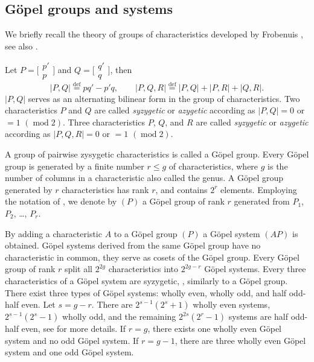 \documentclass[twoside]{amsart}
\DeclareMathOperator{\modR}{mod}
\theoremstyle{definition}
\theoremstyle{plain}
\begin{document}
\subsection{G\"{o}pel groups and systems}
We briefly recall the theory of groups of characteristics developed by Frobenuis \cite{Frob1,Frob2},
see also \cite[Ch.\,XVII]{bak897}. 

Let $P=\big[\begin{smallmatrix} p' \\ p \end{smallmatrix} \big]$ and 
$Q=\big[\begin{smallmatrix} q' \\ q \end{smallmatrix} \big]$, then
$$ |P,Q| \overset{\text{def}}{=} pq'-p'q,\qquad  
|P,Q,R| \overset{\text{def}}{=} |P,Q| + |P,R| + |Q,R|. $$
$|P,Q|$ serves as an alternating bilinear form in the group of characteristics.
Two characteristics $P$ and $Q$ are called \emph{syzygetic} or 
\emph{azygetic} according as $|P,Q| = 0$ or $=1$ $(\modR 2)$.
Three characteristics $P$, $Q$, and $R$ are called \emph{syzygetic} or 
\emph{azygetic} according as $|P,Q,R| = 0$ or $=1$ $(\modR 2)$.

A group of pairwise zysygetic characteristics  is called a G\"{o}pel group.
Every G\"{o}pel group is generated by a finite number $r\leqslant g$ of characteristics, 
where $g$ is the number of columns in a 
characteristic also called the genus. 
A G\"{o}pel group generated by $r$ characteristics has rank $r$, and
contains $2^r$ elements. Employing the notation of  \cite{bak897}, we denote by $(P)$ a 
G\"{o}pel group of rank $r$ generated from $P_1$, $P_2$, \ldots, $P_r$. 


By adding a characteristic $A$ to a G\"{o}pel group $(P)$ a G\"{o}pel system $(AP)$ is obtained.
G\"{o}pel systems derived from the same G\"{o}pel group have no characteristic in common,
they serve as  cosets of the G\"{o}pel  group.
Every G\"{o}pel group of rank $r$ split all $2^{2g}$ characteristics 
into $2^{2g-r}$  G\"{o}pel systems. 
Every three characteristics of a G\"{o}pel system are syzygetic, \cite[Art.\,297]{bak897}, 
similarly to a G\"{o}pel group.
There exist three types of G\"{o}pel systems: wholly even, wholly odd, and 
half odd-half even.  Let $s=g-r$.
There are $2^{s-1}(2^s+1)$ wholly even systems,  $2^{s-1}(2^s-1)$ wholly odd, and the remaining
$2^{2s}(2^r-1)$ systems are half odd-half even, see \cite[Art.\,299--300]{bak897} for more details.
If $r=g$, there exists one wholly even G\"{o}pel system and no odd G\"{o}pel system. 
If $r=g-1$, there are three  wholly even G\"{o}pel system and one odd G\"{o}pel system.
\end{document}
